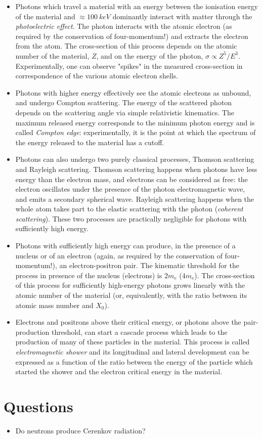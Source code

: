 \begin{itemize}
    \item Photons which travel a material with an energy between the ionisation energy of the material and $\approx\SI{100}{keV}$ dominantly interact with matter through the \emph{photoelectric effect}. The photon interacts with the atomic electron (as required by the conservation of four-momentum!) and extracts the electron from the atom. The cross-section of this process depends on the atomic number of the material, $Z$, and on the energy of the photon, $\sigma \propto Z^5/E^3$. Experimentally, one can observe "spikes" in the measured cross-section in correspondence of the various atomic electron shells.
    \item Photons with higher energy effectively see the atomic electrons as unbound, and undergo Compton scattering. The energy of the scattered photon depends on the scattering angle via simple relativistic kinematics. The maximum released energy corresponds to the minimum photon energy and is called \emph{Compton edge}: experimentally, it is the point at which the spectrum of the energy released to the material has a cutoff.
    \item Photons can also undergo two purely classical processes, Thomson scattering and Rayleigh scattering. Thomson scattering happens when photons have less energy than the electron mass, and electrons can be considered as free: the electron oscillates under the presence of the photon electromagnetic wave, and emits a secondary spherical wave. Rayleigh scattering happens when the whole atom takes part to the elastic scattering with the photon (\emph{coherent scattering}). These two processes are practically negligible for photons with sufficiently high energy.
    \item Photons with sufficiently high energy can produce, in the presence of a nucleus or of an electron (again, as required by the conservation of four-momentum!), an electron-positron pair. The kinematic threshold for the process in presence of the nucleus (electrons) is $2m_e$ ($4m_e$).  The cross-section of this process for sufficiently high-energy photons grows linearly with the atomic number of the material (or, equivalently, with the ratio between its atomic mass number and $X_0$).
    \item Electrons and positrons above their critical energy, or photons above the pair-production threshold, can start a cascade process which leads to the production of many of these particles in the material. This process is called \emph{electromagnetic shower} and its longitudinal and lateral development can be expressed as a function of the ratio between the energy of the particle which started the shower and the electron critical energy in the material.
\end{itemize}
\section*{Questions}
\begin{itemize}
    \item Do neutrons produce Cerenkov radiation?
\end{itemize}


